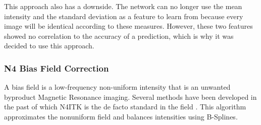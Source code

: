 This approach also has a downside. The network can no longer use the mean intensity and the standard deviation as a feature to learn from because every image will be identical according to these measures. However, these two features showed no correlation to the accuracy of a prediction, which is why it was decided to use this approach.

\subsubsection{N4 Bias Field Correction}

A bias field is a low-frequency non-uniform intensity that is an unwanted byproduct Magnetic Resonance imaging. Several methods have been developed in the past of which N4ITK is the de facto standard in the field \cite{Tustison2010}. This algorithm approximates the nonuniform field and balances intensities using B-Splines. 

